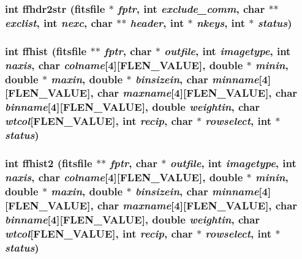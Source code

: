 \subsubsection{\setlength{\rightskip}{0pt plus 5cm}int ffhdr2str (\bf{fitsfile} $\ast$ {\em fptr}, int {\em exclude\_\-comm}, char $\ast$$\ast$ {\em exclist}, int {\em nexc}, char $\ast$$\ast$ {\em header}, int $\ast$ {\em nkeys}, int $\ast$ {\em status})}\label{test_2roimasker_2fitsio_8h_909b37f8894feb8f3e02d35dceee3f53}


\subsubsection{\setlength{\rightskip}{0pt plus 5cm}int ffhist (\bf{fitsfile} $\ast$$\ast$ {\em fptr}, char $\ast$ {\em outfile}, int {\em imagetype}, int {\em naxis}, char {\em colname}[4][FLEN\_\-VALUE], double $\ast$ {\em minin}, double $\ast$ {\em maxin}, double $\ast$ {\em binsizein}, char {\em minname}[4][FLEN\_\-VALUE], char {\em maxname}[4][FLEN\_\-VALUE], char {\em binname}[4][FLEN\_\-VALUE], double {\em weightin}, char {\em wtcol}[FLEN\_\-VALUE], int {\em recip}, char $\ast$ {\em rowselect}, int $\ast$ {\em status})}\label{test_2roimasker_2fitsio_8h_abc1ac3fe3154b853aec9e8069a53104}


\subsubsection{\setlength{\rightskip}{0pt plus 5cm}int ffhist2 (\bf{fitsfile} $\ast$$\ast$ {\em fptr}, char $\ast$ {\em outfile}, int {\em imagetype}, int {\em naxis}, char {\em colname}[4][FLEN\_\-VALUE], double $\ast$ {\em minin}, double $\ast$ {\em maxin}, double $\ast$ {\em binsizein}, char {\em minname}[4][FLEN\_\-VALUE], char {\em maxname}[4][FLEN\_\-VALUE], char {\em binname}[4][FLEN\_\-VALUE], double {\em weightin}, char {\em wtcol}[FLEN\_\-VALUE], int {\em recip}, char $\ast$ {\em rowselect}, int $\ast$ {\em status})}\label{test_2roimasker_2fitsio_8h_82fd106b8fa747b8b0895c6f1419c328}


